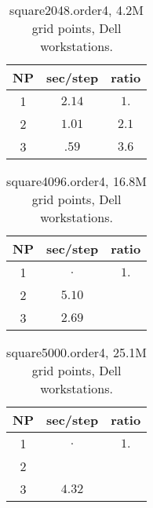 \documentclass[12pt]{article}
\begin{document}
\begin{table}[hbt]
\begin{center}\footnotesize
\begin{tabular}{|c|c|c|} \hline 
     NP       & sec/step   & ratio      \\   \hline\hline 
     1        &  $2.14$    & $ 1. $     \\ 
     2        &  $1.01$    & $ 2.1$     \\ 
     3        &  $.59 $    & $ 3.6$     \\ \hline 
\end{tabular}		
\end{center}		
\caption{square2048.order4, 4.2M grid points, Dell workstations.}
 \label{tab:box} 
\end{table}

\begin{table}[hbt]
\begin{center}\footnotesize
\begin{tabular}{|c|c|c|} \hline 
     NP       & sec/step   & ratio \\   \hline\hline 
     1        &  $.   $    & $ 1. $   \\ 
     2        &  $5.10$    & $    $   \\ 
     3        &  $2.69$    & $    $   \\ \hline 
\end{tabular}		
\end{center}		
\caption{square4096.order4, 16.8M grid points, Dell workstations.}
 \label{tab:box} 
\end{table}

\begin{table}[hbt]
\begin{center}\footnotesize
\begin{tabular}{|c|c|c|} \hline 
     NP       & sec/step   & ratio \\   \hline\hline 
     1        &  $.   $    & $ 1. $   \\ 
     2        &  $    $    & $    $   \\ 
     3        &  $4.32$    & $    $   \\ \hline 
\end{tabular}		
\end{center}		
\caption{square5000.order4, 25.1M grid points, Dell workstations.}
 \label{tab:box} 
\end{table}
\end{document}
